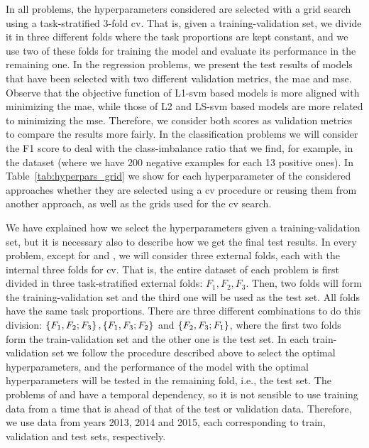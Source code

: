 In all problems, the hyperparameters considered are selected with a grid search using a task-stratified $3$-fold \acrshort{cv}. That is, given a training-validation set, we divide it in three different folds where the task proportions are kept constant, and we use two of these folds for training the model and evaluate its performance in the remaining one.
%
In the regression problems, we present the test results of models that have been selected with two different validation metrics, the \acrshort{mae} and \acrshort{mse}.
%
Observe that the objective function of L1-\acrshort{svm} based models is more aligned with minimizing the \acrshort{mae}, while those of L2 and LS-\acrshort{svm} based models are more related to minimizing the \acrshort{mse}. Therefore, we consider both scores as validation metrics to compare the results more fairly.
%
In the classification problems we will consider the F1 score to deal with the class-imbalance ratio that we find, for example, in the  dataset (where we have 200 negative examples for each 13 positive ones).
%
In Table~\ref{tab:hyperpars_grid} we show for each hyperparameter of the considered approaches whether they are selected using a \acrshort{cv} procedure or reusing them from another approach, as well as the grids used for the \acrshort{cv} search.

We have explained how we select the hyperparameters given a training-validation set, but it is necessary also to describe how we get the final test results.
In every problem, except for  and , we will consider three external folds, each with the internal three folds for \acrshort{cv}. That is, the entire dataset of each problem is first divided in three task-stratified external folds: $F_1, F_2, F_3$. Then, two folds will form the training-validation set and the third one will be used as the test set. All folds have the same task proportions. There are three different combinations to do this division: $\left\{F_1, F_2; F_3\right\}, \left\{F_1, F_3; F_2\right\}$ and $\left\{F_2, F_3; F_1\right\}$, where the first two folds form the train-validation set and the other one is the test set.
%
In each train-validation set we follow the procedure described above to select the optimal hyperparameters, and the performance of the model with the optimal hyperparameters will be tested in the remaining fold, i.e., the test set.
%
The problems of  and  have a temporal dependency, so it is not sensible to use training data from a time that is ahead of that of the test or validation data. Therefore, we use data from years 2013, 2014 and 2015, each corresponding to train, validation and test sets, respectively.
%

